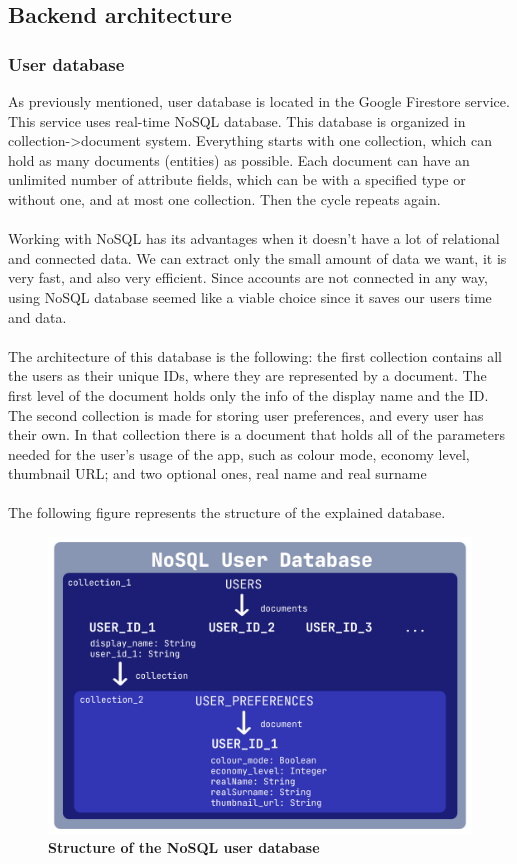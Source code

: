 \subsection{Backend architecture}
\subsubsection{User database}

\hspace{\parindent}As previously mentioned, user database is located in the Google Firestore service. This service uses real-time NoSQL database. This database is organized in collection->document system. Everything starts with one collection, which can hold as many documents (entities) as possible. Each document can have an unlimited number of attribute fields, which can be with a specified type or without one, and at most one collection. Then the cycle repeats again.\\ \\
Working with NoSQL has its advantages when it doesn't have a lot of relational and connected data. We can extract only the small amount of data we want, it is very fast, and also very efficient. Since accounts are not connected in any way, using NoSQL database  seemed like a viable choice since it saves our users time and data. \\ \\
The architecture of this database is the following: the first collection contains all the users as their unique IDs, where they are represented by a document. The first level of the document holds only the info of the display name and the ID.  The second collection is made for storing user preferences, and every user has their own. In that collection there is a document that holds all of the parameters needed for the user's usage of the app, such as colour mode, economy level, thumbnail URL; and two optional ones, real name and real surname
\\ \\
The following figure represents the structure of the explained database.\\
\begin{figure}[!htb]
\centering
\includegraphics[width=\textwidth]{../Images/NoSQLStructurePNG.png}
\caption{\label{fig:dbapiuser}\textbf{Structure of the NoSQL user database}}
\end{figure}
\newpage

